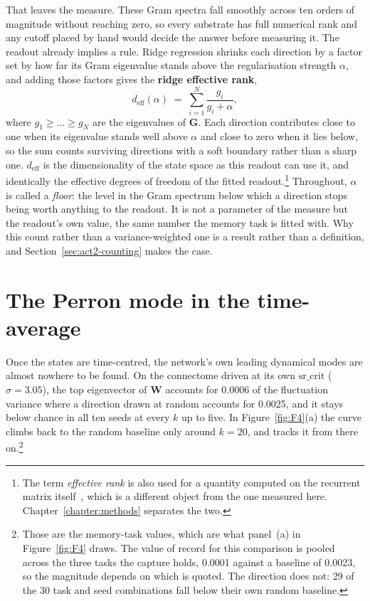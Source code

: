 That leaves the measure. These Gram spectra fall smoothly across ten orders of
magnitude without reaching zero, so every substrate has full numerical rank and
any cutoff placed by hand would decide the answer before measuring it. The
readout already implies a rule. Ridge regression shrinks each direction by a
factor set by how far its Gram eigenvalue stands above the regularisation
strength $\alpha$, and adding those factors gives the \textbf{ridge effective
rank},
\begin{equation}
    d_{\mathrm{eff}}(\alpha)
    \;=\; \sum_{i=1}^{N} \frac{g_i}{g_i + \alpha},
    \label{eq:deff}
\end{equation}
where $g_1 \ge \dots \ge g_N$ are the eigenvalues of $\mathbf{G}$.
Each direction contributes close to one when its eigenvalue stands well above
$\alpha$ and close to zero when it lies below, so the sum counts surviving
directions with a soft boundary rather than a sharp one. $d_{\mathrm{eff}}$ is
the dimensionality of the state space as this readout can use it, and identically
the effective degrees of freedom of the fitted
readout.\footnote{The term \emph{effective rank} is also used for a quantity
computed on the recurrent matrix itself~\cite{clark2025connectivity}, which is a
different object from the one measured here. Chapter~\ref{chapter:methods}
separates the two.}
Throughout, $\alpha$ is called a \emph{floor}: the level in the Gram spectrum below 
which a direction stops being worth anything to the readout. It is not a parameter of the measure 
but the readout's own value, the same number the memory task is fitted with.
Why this count rather than a variance-weighted
one is a result rather than a definition, and Section~\ref{sec:act2-counting}
makes the case.






\section{The Perron mode in the time-average}
\label{sec:act2-perron}
\bigskip


Once the states are time-centred, the network's own leading dynamical modes are
almost nowhere to be found. On the connectome driven at its own $\mathrm{sr\_crit}$ 
($\sigma = 3.05$), the top eigenvector of $\mathbf{W}$ accounts for
0.0006 %
of the fluctuation variance where a direction drawn at random accounts for
0.0025, %
and it stays below chance in all ten seeds at every $k$ up to
five. %
In Figure~\ref{fig:F4}(a) the curve climbs back to the random baseline only
around $k = 20$, %
and tracks it from there on.\footnote{Those are the memory-task values, which
are what panel~(a) in Figure~\ref{fig:F4} draws. The value of record for this
comparison is pooled across the three tasks the capture holds,
0.0001 %
against a baseline of 0.0023, %
so the magnitude depends on which is quoted. The direction does not:
29 of the 30 %
task and seed combinations fall below their own random baseline.}

